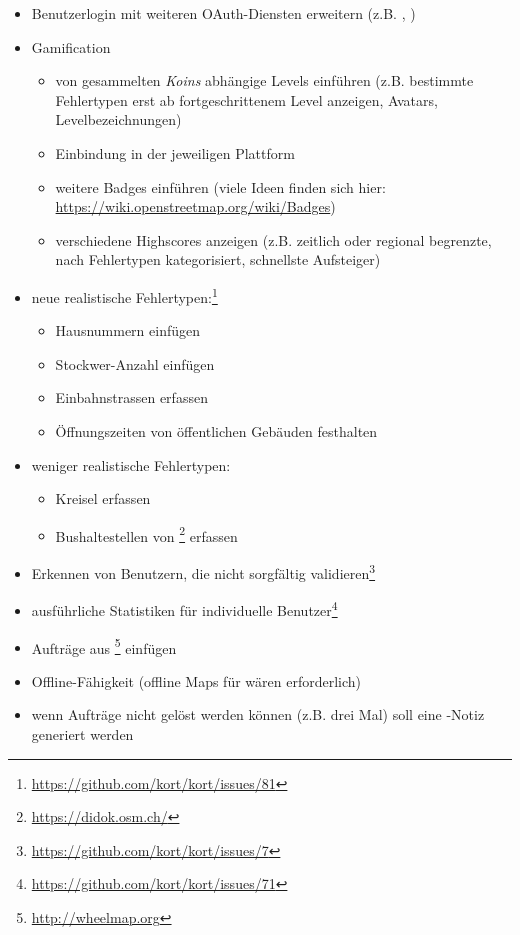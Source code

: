 \begin{itemize}
	\item Benutzerlogin mit weiteren OAuth-Diensten erweitern (z.B. , )
	\item \gls{Gamification}
	\begin{itemize}
		\item von gesammelten \emph{Koins} abhängige Levels einführen (z.B. bestimmte Fehlertypen erst ab fortgeschrittenem Level anzeigen, Avatars, Levelbezeichnungen)
		\item Einbindung in  der jeweiligen Plattform
		\item weitere Badges einführen (viele Ideen finden sich hier: \url{https://wiki.openstreetmap.org/wiki/Badges})
		\item verschiedene Highscores anzeigen (z.B. zeitlich oder regional begrenzte, nach Fehlertypen kategorisiert, schnellste Aufsteiger)
	\end{itemize}
	\item neue realistische Fehlertypen:\footnote{\url{https://github.com/kort/kort/issues/81}}
	\begin{itemize}
		\item Hausnummern einfügen
		\item Stockwer-Anzahl einfügen
		\item Einbahnstrassen erfassen
		\item Öffnungszeiten von öffentlichen Gebäuden festhalten
	\end{itemize}
	\item weniger realistische Fehlertypen:
		\begin{itemize}
			\item Kreisel erfassen
			\item Bushaltestellen von \footnote{\url{https://didok.osm.ch/}} erfassen
		\end{itemize}
	\item Erkennen von Benutzern, die nicht sorgfältig validieren\footnote{\url{https://github.com/kort/kort/issues/7}}
	\item ausführliche Statistiken für individuelle Benutzer\footnote{\url{https://github.com/kort/kort/issues/71}}
	\item Aufträge aus \footnote{\url{http://wheelmap.org}}	einfügen
	\item Offline-Fähigkeit (offline Maps für  wären erforderlich)
	\item wenn Aufträge nicht gelöst werden können (z.B. drei Mal) soll eine -Notiz generiert werden
\end{itemize}

